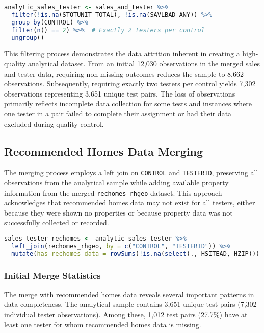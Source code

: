 \documentclass{article}
\begin{document}
\begin{lstlisting}[language=R]
analytic_sales_tester <- sales_and_tester %>%
  filter(!is.na(STOTUNIT_TOTAL), !is.na(SAVLBAD_ANY)) %>%
  group_by(CONTROL) %>%
  filter(n() == 2) %>%  # Exactly 2 testers per control
  ungroup()
\end{lstlisting}

This filtering process demonstrates the data attrition inherent in creating a high-quality analytical dataset. From an initial 12,030 observations in the merged sales and tester data, requiring non-missing outcomes reduces the sample to 8,662 observations. Subsequently, requiring exactly two testers per control yields 7,302 observations representing 3,651 unique test pairs. The loss of observations primarily reflects incomplete data collection for some tests and instances where one tester in a pair failed to complete their assignment or had their data excluded during quality control.

\subsection{Recommended Homes Data Merging}

The merging process employs a left join on \texttt{CONTROL} and \texttt{TESTERID}, preserving all observations from the analytical sample while adding available property information from the merged \texttt{rechomes\_rhgeo} dataset. This approach acknowledges that recommended homes data may not exist for all testers, either because they were shown no properties or because property data was not successfully collected or recorded.

\begin{lstlisting}[language=R]
sales_tester_rechomes <- analytic_sales_tester %>%
  left_join(rechomes_rhgeo, by = c("CONTROL", "TESTERID")) %>%
  mutate(has_rechomes_data = rowSums(!is.na(select(., HSITEAD, HZIP))) > 0)
\end{lstlisting}

\subsubsection{Initial Merge Statistics}

The merge with recommended homes data reveals several important patterns in data completeness. The analytical sample contains 3,651 unique test pairs (7,302 individual tester observations). Among these, 1,012 test pairs (27.7\%) have at least one tester for whom recommended homes data is missing. 
\end{document}
